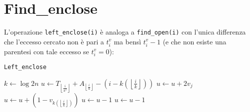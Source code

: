\documentclass{article}
\begin{document}
\section{Find\_enclose}
L'operazione \texttt{left\_enclose(i)} è analoga a \texttt{find\_open(i)} con l'unica differenza che l'eccesso cercato non è pari a $t^v_i$ ma bensì $t^v_i-1$ (e che non esiste una parentesi con tale eccesso se $t^v_i=0$):
    \begin{algorithm}[H]
    \caption{\texttt{Left\_enclose}}\label{leftenclose}
    \begin{algorithmic}[1]
        \State $k\gets\log{2n}$
        \State $u\gets T_{\left\lfloor{\frac{i}{k^2}}\right\rfloor}+A_{\left\lfloor{\frac{i}{k}}\right\rfloor}-(i-k(\left\lfloor{\frac{i}{k}}\right\rfloor))$
            \State $u\gets u+2v_j$
        \EndFor
        \State $u\gets u+(1-v_{k(\left\lfloor{\frac{i}{k}}\right\rfloor)})$
            \State $u\gets u-1$
        \EndIf
        \State $u\gets u-1$
    \end{algorithmic}
    \end{algorithm}    
\end{document}
